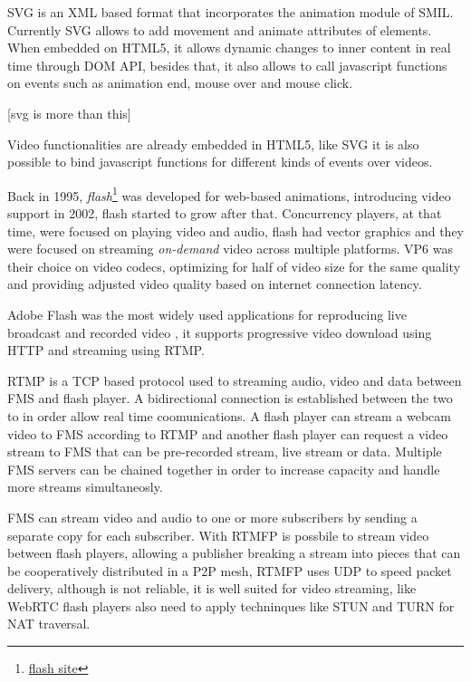   \ac{SVG} is an \ac{XML} based format that incorporates the animation module of \ac{SMIL}. Currently \ac{SVG} allows to add movement and animate attributes of elements. When embedded on \ac{HTML}5, it allows dynamic changes to inner content in real time through \ac{DOM} \ac{API}, besides that, it also allows to call javascript functions on events such as animation end, mouse over and mouse click.

{\color{red} [svg is more than this]}

  Video functionalities are already embedded in \ac{HTML}5, like \ac{SVG} it is also possible to bind javascript functions for different kinds of events over videos.

  Back in 1995, \textit{flash}\footnote{\url{flash site}} was developed for web-based animations, introducing video support in 2002, flash started to grow after that. Concurrency players, at that time, were focused on playing video and audio, flash had vector graphics and they were focused on streaming \textit{on-demand} video across multiple platforms. VP6 was their choice on video codecs, optimizing for half of video size for the same quality and providing adjusted video quality based on internet connection latency. 

  Adobe Flash was the most widely used applications for reproducing live broadcast and recorded video \cite{flashvideo}, it supports progressive video download using \ac{HTTP} and streaming using \ac{RTMP}. 

  \ac{RTMP} is a \ac{TCP} based protocol used to streaming audio, video and data between \ac{FMS} and flash player. A bidirectional connection is established between the two to in order allow real time coomunications. A flash player can stream a webcam video to \ac{FMS} according to \ac{RTMP} and another flash player can request a video stream to \ac{FMS} that can be pre-recorded stream, live stream or data. Multiple \ac{FMS} servers can be chained together in order to increase capacity and handle more streams simultaneosly.

  \ac{FMS} can stream video and audio to one or more subscribers by sending a separate copy for each subscriber. With \ac{RTMFP} is possbile to stream video between flash players, allowing a publisher breaking a stream into pieces that can be cooperatively distributed in a P2P mesh, \ac{RTMFP} uses \ac{UDP} to speed packet delivery, although is not reliable, it is well suited for video streaming, like \ac{WebRTC} flash players also need to apply techninques like \ac{STUN} and \ac{TURN} for \ac{NAT} traversal.

